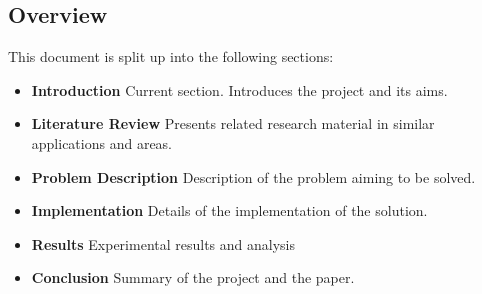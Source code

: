 \subsection{Overview}
This document is split up into the following sections:
\begin{itemize}
 \item \textbf{Introduction} Current section. Introduces the project and its aims.
 \item \textbf{Literature Review} Presents related research material in similar applications and areas.
 \item \textbf{Problem Description} Description of the problem aiming to be solved.
 \item \textbf{Implementation} Details of the implementation of the solution.
 \item \textbf{Results} Experimental results and analysis
 \item \textbf{Conclusion} Summary of the project and the paper.
\end{itemize}





